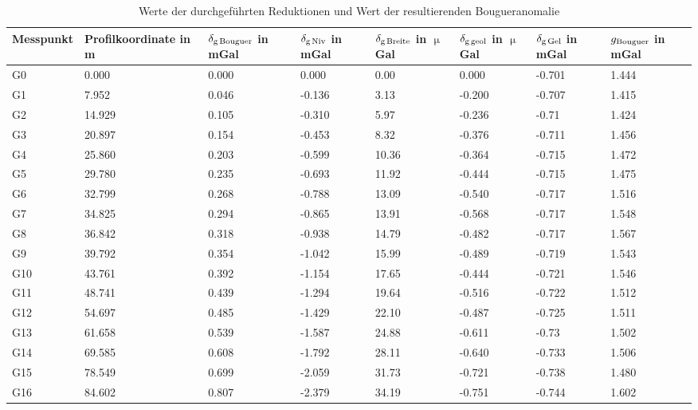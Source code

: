 \begin{landscape}
\begin{table}[!ht]
\centering
\caption{Werte der durchgeführten Reduktionen und Wert der resultierenden Bougueranomalie}
\label{tab:reduktionen}
\begin{tabular}{llllllll}
\toprule
Messpunkt & Profilkoordinate in m & $\delta_{\mathrm{g\,Bouguer}}$ in mGal & $\delta_{\mathrm{g\,Niv}}$ in mGal & $\delta_{\mathrm{g\,Breite}}$ in $\upmu$Gal & $\delta_{\mathrm{g\,geol}}$ in $\upmu$Gal & $\delta_{\mathrm{g\,Gel}}$ in mGal & $g_{\mathrm{Bouguer}}$ in mGal \\
\midrule
G0 & 0.000 & 0.000 & 0.000 & 0.00 & 0.000 & -0.701 & 1.444 \\
G1 & 7.952 & 0.046 & -0.136 & 3.13 & -0.200 & -0.707 & 1.415 \\
G2 & 14.929 & 0.105 & -0.310 & 5.97 & -0.236 & -0.71 & 1.424 \\
G3 & 20.897 & 0.154 & -0.453 & 8.32 & -0.376 & -0.711 & 1.456 \\
G4 & 25.860 & 0.203 & -0.599 & 10.36 & -0.364 & -0.715 & 1.472 \\
G5 & 29.780 & 0.235 & -0.693 & 11.92 & -0.444 & -0.715 & 1.475 \\
G6 & 32.799 & 0.268 & -0.788 & 13.09 & -0.540 & -0.717 & 1.516 \\
G7 & 34.825 & 0.294 & -0.865 & 13.91 & -0.568 & -0.717 & 1.548 \\
G8 & 36.842 & 0.318 & -0.938 & 14.79 & -0.482 & -0.717 & 1.567 \\
G9 & 39.792 & 0.354 & -1.042 & 15.99 & -0.489 & -0.719 & 1.543 \\
G10 & 43.761 & 0.392 & -1.154 & 17.65 & -0.444 & -0.721 & 1.546 \\
G11 & 48.741 & 0.439 & -1.294 & 19.64 & -0.516 & -0.722 & 1.512 \\
G12 & 54.697 & 0.485 & -1.429 & 22.10 & -0.487 & -0.725 & 1.511 \\
G13 & 61.658 & 0.539 & -1.587 & 24.88 & -0.611 & -0.73 & 1.502 \\
G14 & 69.585 & 0.608 & -1.792 & 28.11 & -0.640 & -0.733 & 1.506 \\
G15 & 78.549 & 0.699 & -2.059 & 31.73 & -0.721 & -0.738 & 1.480 \\
G16 & 84.602 & 0.807 & -2.379 & 34.19 & -0.751 & -0.744 & 1.602 \\ \bottomrule
\end{tabular}
\end{table}
\end{landscape}

